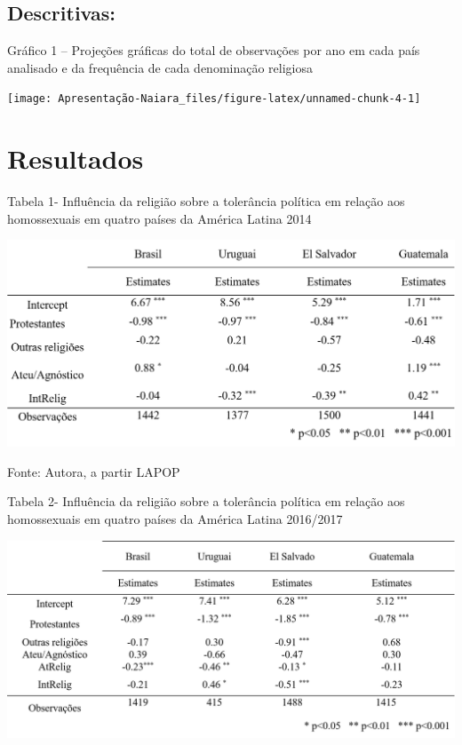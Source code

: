 \documentclass[
]{article}
\begin{document}
\hypertarget{descritivas}{%
\subsection{Descritivas:}\label{descritivas}}

Gráfico 1 -- Projeções gráficas do total de observações por ano em cada
país analisado e da frequência de cada denominação religiosa

\begin{center}\texttt{[image: Apresentação-Naiara\_files/figure-latex/unnamed-chunk-4-1]} \end{center}

\vspace{5truemm}

\hypertarget{resultados}{%
\section{Resultados}\label{resultados}}

Tabela 1- Influência da religião sobre a tolerância política em relação
aos homossexuais em quatro países da América Latina 2014

\begin{center}\includegraphics[width=0.8\linewidth]{tabela1} \end{center}

Fonte: Autora, a partir LAPOP

Tabela 2- Influência da religião sobre a tolerância política em relação
aos homossexuais em quatro países da América Latina 2016/2017

\begin{center}\includegraphics[width=0.8\linewidth]{tabela2} \end{center}
\end{document}
